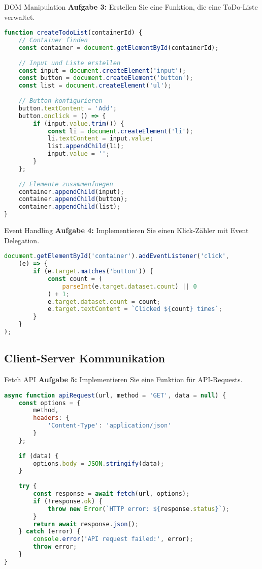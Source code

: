 \begin{example2}{DOM Manipulation}
    \textbf{Aufgabe 3:} Erstellen Sie eine Funktion, die eine ToDo-Liste verwaltet.
    \begin{lstlisting}[language=JavaScript, style=basesmol]
function createTodoList(containerId) {
    // Container finden
    const container = document.getElementById(containerId);
    
    // Input und Liste erstellen
    const input = document.createElement('input');
    const button = document.createElement('button');
    const list = document.createElement('ul');
    
    // Button konfigurieren
    button.textContent = 'Add';
    button.onclick = () => {
        if (input.value.trim()) {
            const li = document.createElement('li');
            li.textContent = input.value;
            list.appendChild(li);
            input.value = '';
        }
    };
    
    // Elemente zusammenfuegen
    container.appendChild(input);
    container.appendChild(button);
    container.appendChild(list);
}
    \end{lstlisting}
\end{example2}

\begin{example2}{Event Handling}
    \textbf{Aufgabe 4:} Implementieren Sie einen Klick-Zähler mit Event Delegation.
    \begin{lstlisting}[language=JavaScript, style=basesmol]
document.getElementById('container').addEventListener('click', 
    (e) => {
        if (e.target.matches('button')) {
            const count = (
                parseInt(e.target.dataset.count) || 0
            ) + 1;
            e.target.dataset.count = count;
            e.target.textContent = `Clicked ${count} times`;
        }
    }
);
    \end{lstlisting}
\end{example2}

\subsection{Client-Server Kommunikation}

\begin{example2}{Fetch API}
    \textbf{Aufgabe 5:} Implementieren Sie eine Funktion für API-Requests.
    \begin{lstlisting}[language=JavaScript, style=basesmol]
async function apiRequest(url, method = 'GET', data = null) {
    const options = {
        method,
        headers: {
            'Content-Type': 'application/json'
        }
    };
    
    if (data) {
        options.body = JSON.stringify(data);
    }
    
    try {
        const response = await fetch(url, options);
        if (!response.ok) {
            throw new Error(`HTTP error: ${response.status}`);
        }
        return await response.json();
    } catch (error) {
        console.error('API request failed:', error);
        throw error;
    }
}
    \end{lstlisting}
\end{example2}

